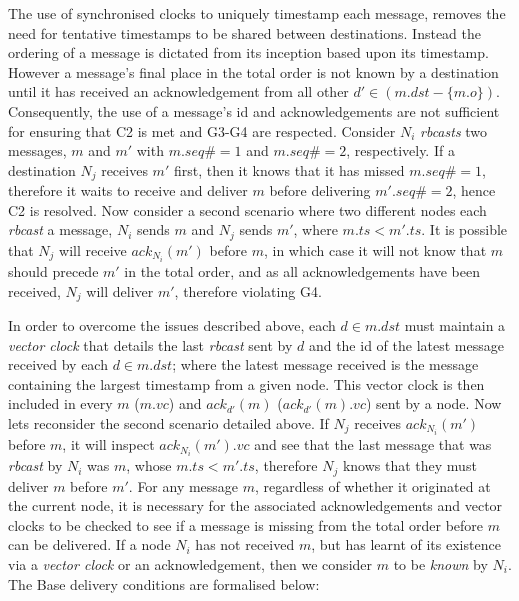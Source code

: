     The use of synchronised clocks to uniquely timestamp each message, removes the need for tentative timestamps to be shared between destinations.  Instead the ordering of a message is dictated from its inception based upon its timestamp.  However a message's final place in the total order is not known by a destination until it has received an acknowledgement from all other $d' \in (m.dst - \{m.o\})$.  Consequently, the use of a message's id and acknowledgements are not sufficient for ensuring that C2 is met and G3-G4 are respected.  Consider $N_i$ \emph{rbcasts} two messages, $m$ and $m'$ with $m.seq\# = 1$ and $m.seq\# = 2$, respectively.  If a destination $N_j$ receives $m'$ first, then it knows that it has missed $m.seq\# = 1$, therefore it waits to receive and deliver $m$ before delivering $m'.seq\# = 2$, hence C2 is resolved.  Now consider a second scenario where two different nodes each \emph{rbcast} a message, $N_i$ sends $m$ and $N_j$ sends $m'$, where $m.ts < m'.ts$.  It is possible that $N_j$ will receive $ack_{N_i}(m')$ before $m$, in which case it will not know that $m$ should precede $m'$ in the total order, and as all acknowledgements have been received, $N_j$ will deliver $m'$, therefore violating G4.  
    
    In order to overcome the issues described above, each $d \in m.dst$ must maintain a \emph{vector clock}\citep{Mattern88virtualtime, fidge1988timestamps} that details the last \emph{rbcast} sent by $d$ and the id of the latest message received by each $d \in m.dst$; where the latest message received is the message containing the largest timestamp from a given node.  This vector clock is then included in every $m$ ($m.vc$) and $ack_{d'}(m)$ ($ack_{d'}(m).vc$) sent by a node.  Now lets reconsider the second scenario detailed above.  If $N_j$ receives $ack_{N_i}(m')$ before $m$, it will inspect $ack_{N_i}(m').vc$ and see that the last message that was \emph{rbcast} by $N_i$ was $m$, whose $m.ts < m'.ts$, therefore $N_j$ knows that they must deliver $m$ before $m'$.  For any message $m$, regardless of whether it originated at the current node, it is necessary for the associated acknowledgements and vector clocks to be checked to see if a message is missing from the total order before $m$ can be delivered.  If a node $N_i$ has not received $m$, but has learnt of its existence via a \emph{vector clock} or an acknowledgement, then we consider $m$ to be \emph{known} by $N_i$.  The \textsf{Base} delivery conditions are formalised below:
    
